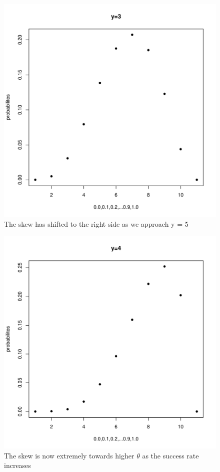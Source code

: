\documentclass[11pt]{article}
\begin{document}
\begin{enumerate}
\begin{enumerate}
\begin{figure}[H]
	\end{figure}
	\begin{figure}[H]
		\centering
		\caption{The skew has shifted to the right side as we approach y = 5}
		\includegraphics[scale=.6]{y=3graph.pdf}
	\end{figure}
	\begin{figure}[H]
		\centering
		\caption{The skew is now extremely towards higher $\theta$ as the success rate increases}
		\includegraphics[scale=.6]{y=4graph.pdf}

\end{figure}
\end{enumerate}
\end{enumerate}
\end{document}
